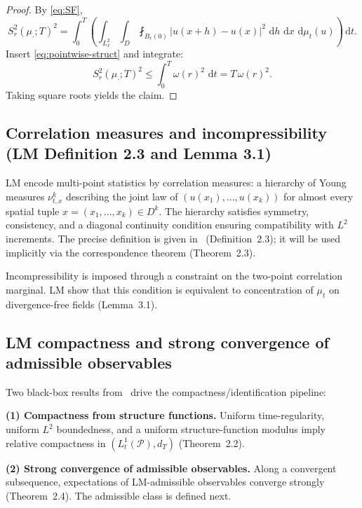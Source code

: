 \documentclass{article}
\numberwithin{equation}{section}
\theoremstyle{plain}
\theoremstyle{definition}
\theoremstyle{remark}
\newcommand{\Pcal}{\mathcal{P}}
\newcommand{\dd}{\,\mathrm{d}}
\begin{document}
\begin{proof}
By \eqref{eq:SF},
\[
S_r^2(\mu_\cdot;T)^2
=
\int_0^T\left(\int_{L^2_x}\int_D\fint_{B_r(0)}|u(x+h)-u(x)|^2\,\dd h\,\dd x\,\dd\mu_t(u)\right)\dd t.
\]
Insert \eqref{eq:pointwise-struct} and integrate:
\[
S_r^2(\mu_\cdot;T)^2 \le \int_0^T \omega(r)^2\,\dd t = T\,\omega(r)^2.
\]
Taking square roots yields the claim.
\end{proof}

\subsection{Correlation measures and incompressibility (LM Definition 2.3 and Lemma 3.1)}

LM encode multi-point statistics by correlation measures: a hierarchy of Young measures $\nu^k_{t,x}$ describing the joint
law of $(u(x_1),\dots,u(x_k))$ for almost every spatial tuple $x=(x_1,\dots,x_k)\in D^k$. The hierarchy satisfies symmetry,
consistency, and a diagonal continuity condition ensuring compatibility with $L^2$ increments. The precise definition is
given in~\cite{LMP2021} (Definition~2.3); it will be used implicitly via the correspondence theorem (Theorem~2.3).

Incompressibility is imposed through a constraint on the two-point correlation marginal. LM show that this condition is
equivalent to concentration of $\mu_t$ on divergence-free fields (Lemma~3.1).

\subsection{LM compactness and strong convergence of admissible observables}

Two black-box results from~\cite{LMP2021} drive the compactness/identification pipeline:

\smallskip
\noindent\textbf{(1) Compactness from structure functions.}
Uniform time-regularity, uniform $L^2$ boundedness, and a uniform structure-function modulus imply relative compactness
in $(L^1_t(\Pcal),d_T)$ (Theorem~2.2).

\smallskip
\noindent\textbf{(2) Strong convergence of admissible observables.}
Along a convergent subsequence, expectations of LM-admissible observables converge strongly (Theorem~2.4). The admissible
class is defined next.
\end{document}
